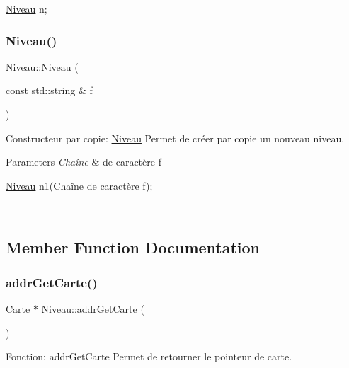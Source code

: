 \begin{DoxyCode}
\hyperlink{classNiveau}{Niveau} n;
\end{DoxyCode}
 \mbox{\label{classNiveau_a5f59a46da066f15b0c21154cbf583490}} 
\subsubsection{\texorpdfstring{Niveau()}{Niveau()}\hspace{0.1cm}{\footnotesize\ttfamily [2/2]}}
{\footnotesize\ttfamily Niveau\+::\+Niveau (\begin{DoxyParamCaption}\item[{const std\+::string \&}]{f }\end{DoxyParamCaption})}



Constructeur par copie\+: \hyperlink{classNiveau}{Niveau} Permet de créer par copie un nouveau niveau. 


\begin{DoxyParams}{Parameters}
{\em Chaîne} & de caractère f 
\begin{DoxyCode}
\hyperlink{classNiveau}{Niveau} n1(Chaîne de caractère f);
\end{DoxyCode}
 \\
\hline
\end{DoxyParams}


\subsection{Member Function Documentation}
\mbox{\label{classNiveau_a47ea8b8f36e27be8ad0d3f534a956260}} 
\subsubsection{\texorpdfstring{addr\+Get\+Carte()}{addrGetCarte()}}
{\footnotesize\ttfamily \hyperlink{classCarte}{Carte} $\ast$ Niveau\+::addr\+Get\+Carte (\begin{DoxyParamCaption}{ }\end{DoxyParamCaption})}



Fonction\+: addr\+Get\+Carte Permet de retourner le pointeur de carte. 

